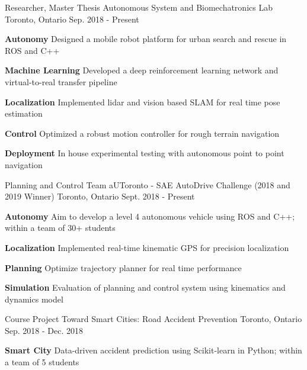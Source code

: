 \begin{cventries}
	\cventry
	{Researcher, Master Thesis}
	{Autonomous System and Biomechatronics Lab}
	{Toronto, Ontario}
	{Sep. 2018 - Present}
	{
		\begin{cvitems}
			\item {
				\textbf{Autonomy} Designed a mobile robot platform for urban search and rescue in ROS and C++
			}
			\item {
				\textbf{Machine Learning} Developed a deep reinforcement learning network and virtual-to-real transfer pipeline
			}
			\item {
				\textbf{Localization} Implemented lidar and vision based SLAM for real time pose estimation
			}
			\item {
				\textbf{Control} Optimized a robust motion controller for rough terrain navigation
			}
			\item {
				\textbf{Deployment} In house experimental testing with autonomous point to point navigation
			}
		\end{cvitems}
	}
	\cventry
	{Planning and Control Team}
	{aUToronto - SAE AutoDrive Challenge (2018 and 2019 Winner)}
	{Toronto, Ontario}
	{Sept. 2018 - Present}
	{
		\begin{cvitems}
			\item {\textbf{Autonomy} Aim to develop a level 4 autonomous vehicle using ROS and C++; within a team of 30+ students}
			\item {\textbf{Localization} Implemented real-time kinematic GPS for precision localization
			}
			\item {\textbf{Planning} Optimize trajectory planner for real time performance		
			}
			\item {\textbf{Simulation} Evaluation of planning and control system using kinematics and dynamics model
			}
		\end{cvitems}
	}	
	\cventry
	{Course Project}
	{Toward Smart Cities: Road Accident Prevention}
	{Toronto, Ontario}
	{Sep. 2018 - Dec. 2018}
	{
		\begin{cvitems}
			\item {\textbf{Smart City} Data-driven accident prediction using Scikit-learn in Python; within a team of 5 students}

\end{cvitems}}
\end{cventries}
